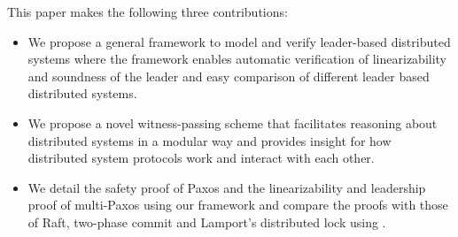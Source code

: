 This paper makes the following three contributions:
\begin{itemize}[leftmargin=*]
\item We propose a general framework to model and verify leader-based
	distributed systems where the framework enables automatic verification
	of linearizability and soundness of the leader and easy comparison of
	different leader based distributed systems.
\item We propose a novel witness-passing scheme that facilitates
	reasoning about distributed systems in a modular way
	and provides insight for how distributed system protocols work and
	interact with each other.
\item We detail the safety proof of Paxos and the linearizability and leadership
	proof of multi-Paxos using our framework and compare the proofs with
	those of Raft, two-phase commit and Lamport's distributed lock using \sysname{}.
\end{itemize}


